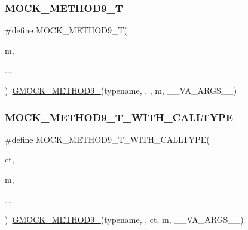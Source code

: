\mbox{\label{googletest-master_2googlemock_2include_2gmock_2gmock-generated-function-mockers_8h_a838c68cbdf422cfc703b83daf1d1f1e1}} 
\subsubsection{\texorpdfstring{MOCK\_METHOD9\_T}{MOCK\_METHOD9\_T}}
{\footnotesize\ttfamily \#define M\+O\+C\+K\+\_\+\+M\+E\+T\+H\+O\+D9\+\_\+T(\begin{DoxyParamCaption}\item[{}]{m,  }\item[{}]{... }\end{DoxyParamCaption})~\mbox{\hyperlink{_obj__test_2lib_2googletest-release-1_88_81_2googlemock_2include_2gmock_2gmock-generated-function-mockers_8h_aa820171a19cc587c247dbe05cbffc55f}{G\+M\+O\+C\+K\+\_\+\+M\+E\+T\+H\+O\+D9\+\_\+}}(typename, , , m, \+\_\+\+\_\+\+V\+A\+\_\+\+A\+R\+G\+S\+\_\+\+\_\+)}

\mbox{\label{googletest-master_2googlemock_2include_2gmock_2gmock-generated-function-mockers_8h_ad1bd879e10bad098cf68c27c75f4be09}} 
\subsubsection{\texorpdfstring{MOCK\_METHOD9\_T\_WITH\_CALLTYPE}{MOCK\_METHOD9\_T\_WITH\_CALLTYPE}}
{\footnotesize\ttfamily \#define M\+O\+C\+K\+\_\+\+M\+E\+T\+H\+O\+D9\+\_\+\+T\+\_\+\+W\+I\+T\+H\+\_\+\+C\+A\+L\+L\+T\+Y\+PE(\begin{DoxyParamCaption}\item[{}]{ct,  }\item[{}]{m,  }\item[{}]{... }\end{DoxyParamCaption})~\mbox{\hyperlink{_obj__test_2lib_2googletest-release-1_88_81_2googlemock_2include_2gmock_2gmock-generated-function-mockers_8h_aa820171a19cc587c247dbe05cbffc55f}{G\+M\+O\+C\+K\+\_\+\+M\+E\+T\+H\+O\+D9\+\_\+}}(typename, , ct, m, \+\_\+\+\_\+\+V\+A\+\_\+\+A\+R\+G\+S\+\_\+\+\_\+)}

